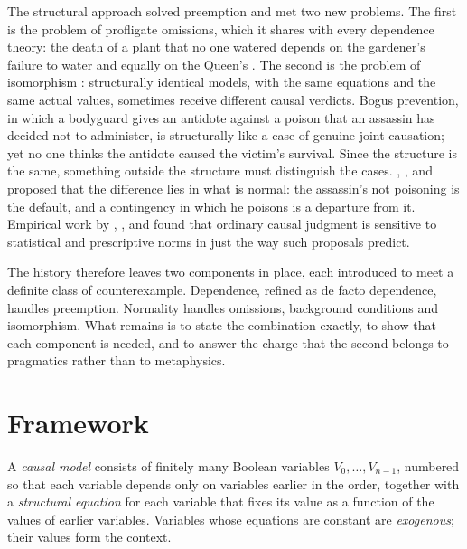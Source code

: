 \documentclass{situationist-preprint}
\begin{document}
The structural approach solved preemption and met two new problems. The first is the problem of profligate omissions, which it shares with every dependence theory: the death of a plant that no one watered depends on the gardener's failure to water and equally on the Queen's \citep{Beebee2004,McGrath2005,Thomson2003}. The second is the problem of isomorphism \citep{Hall2007,Hitchcock2007}: structurally identical models, with the same equations and the same actual values, sometimes receive different causal verdicts. Bogus prevention, in which a bodyguard gives an antidote against a poison that an assassin has decided not to administer, is structurally like a case of genuine joint causation; yet no one thinks the antidote caused the victim's survival. Since the structure is the same, something outside the structure must distinguish the cases. \citet{Menzies2004}, \citet{Hitchcock2007}, \citet{Halpern2008} and \citet{HalpernHitchcock2015} proposed that the difference lies in what is normal: the assassin's not poisoning is the default, and a contingency in which he poisons is a departure from it. Empirical work by \citet{KnobeFraser2008}, \citet{HitchcockKnobe2009}, \citet{Kominsky2015} and \citet{Icard2017} found that ordinary causal judgment is sensitive to statistical and prescriptive norms in just the way such proposals predict.

The history therefore leaves two components in place, each introduced to meet a definite class of counterexample. Dependence, refined as de facto dependence, handles preemption. Normality handles omissions, background conditions and isomorphism. What remains is to state the combination exactly, to show that each component is needed, and to answer the charge that the second belongs to pragmatics rather than to metaphysics.

\section{Framework}\label{s:framework}

\begin{definition}\label{d:model}
A \emph{causal model} consists of finitely many Boolean variables $V_0, \dots, V_{n-1}$, numbered so that each variable depends only on variables earlier in the order, together with a \emph{structural equation} for each variable that fixes its value as a function of the values of earlier variables. Variables whose equations are constant are \emph{exogenous}; their values form the context.
\end{definition}
\end{document}
